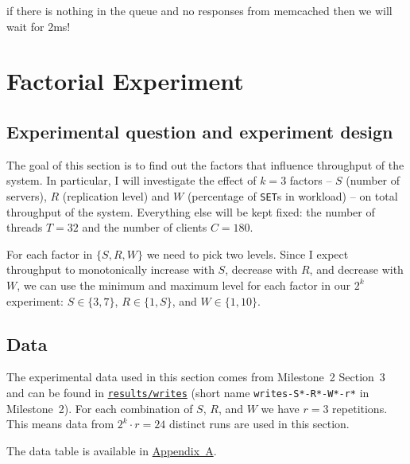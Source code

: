 \documentclass[11pt]{article}
\newcommand{\set}[0]{\texttt{SET}}
\begin{document}
if there is nothing in the queue and no responses from memcached then we will wait for 2ms!

\clearpage
\section{Factorial Experiment}\label{sec:part4-2k-experiment}

\subsection{Experimental question and experiment design}
The goal of this section is to find out the factors that influence throughput of the system. In particular, I will investigate the effect of $k=3$ factors -- $S$ (number of servers), $R$ (replication level) and $W$ (percentage of \set{}s in workload) -- on total throughput of the system. Everything else will be kept fixed: the number of threads $T=32$ and the number of clients $C=180$.

For each factor in $\{S,R,W\}$ we need to pick two levels. Since I expect throughput to monotonically increase with $S$, decrease with $R$, and decrease with $W$, we can use the minimum and maximum level for each factor in our $2^k$ experiment: $S \in \{3, 7\}$, $R \in \{1, S\}$, and $W \in \{1, 10\}$.


\subsection{Data}

The experimental data used in this section comes from Milestone~2 Section~3 and can be found in \texttt{\href{https://gitlab.inf.ethz.ch/pungast/asl-fall16-project/tree/master/results/writes}{results/writes}} (short name \texttt{writes-S*-R*-W*-r*} in Milestone~2). For each combination of $S$, $R$, and $W$ we have $r=3$ repetitions. This means data from $2^k \cdot r = 24$ distinct runs are used in this section.

The data table is available in \hyperref[sec:appa]{Appendix~A}.

%
\end{document}
